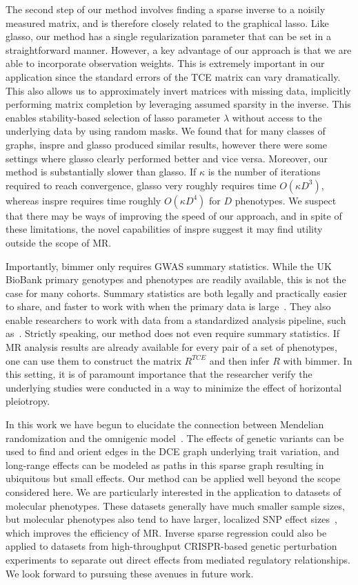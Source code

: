\documentclass{article}
\begin{document}
The second step of our method involves finding a sparse inverse to a noisily measured
matrix, and is therefore closely related to the graphical lasso. Like glasso, our method
 has a single regularization parameter that can be set in a straightforward manner.
However, a key advantage of our approach is that we are able to incorporate
observation weights. This is extremely important in our application since the standard errors
of the TCE matrix can vary dramatically. This also allows us to approximately invert matrices
with missing data, implicitly performing matrix completion by leveraging assumed
sparsity in the inverse. This enables stability-based selection of lasso parameter
 $\lambda$ without access to the underlying data by using random masks.
We found that for many classes of graphs,
inspre and glasso produced similar results, however there were some settings where glasso
clearly performed better and vice versa.
Moreover, our method is substantially slower than glasso. If $\kappa$ is the number
of iterations required to reach convergence, glasso very roughly requires time
$O(\kappa D^3)$, whereas inspre requires time roughly $O(\kappa D^4)$ for $D$ phenotypes. We suspect that
there may be ways of improving the speed of our approach, and in spite of these limitations,
the novel capabilities of inspre suggest it may find utility
outside the scope of MR.

Importantly, bimmer only requires GWAS summary statistics.
While the UK BioBank primary genotypes and phenotypes are readily available,
this is not the case for many cohorts. Summary
statistics are both legally and practically easier to share, and faster to work with when the primary
data is large~\cite{Pasaniuc2017}. They also enable researchers to work with data from a
standardized analysis pipeline, such as~\cite{NealeUKBB}.
Strictly speaking, our method does not even require summary statistics. If
MR analysis results are already available for every pair of a set of phenotypes,
one can use them to construct the matrix $R^{TCE}$ and then infer $R$ with
bimmer. In this setting, it is of paramount importance that the researcher verify
the underlying studies were conducted in a way to minimize the effect of
horizontal pleiotropy.

In this work we have begun to elucidate the connection between Mendelian randomization
and the omnigenic model~\cite{Boyle2017}. The effects of genetic variants
can be used to find and orient edges
in the DCE graph underlying trait variation, and long-range effects can be modeled
as paths in this sparse graph resulting in ubiquitous but small effects.
 Our method can be applied well beyond the scope considered
here. We are particularly interested in the application to datasets of molecular phenotypes.
These datasets generally have much smaller sample sizes, but molecular phenotypes also
tend to have larger, localized SNP effect sizes~\cite{gtex2017}, which improves the efficiency
of MR. Inverse sparse regression could also be applied to datasets from high-throughput CRISPR-based
genetic perturbation experiments to separate out direct effects from mediated regulatory relationships.
We look forward to pursuing these avenues in future work.
\end{document}
